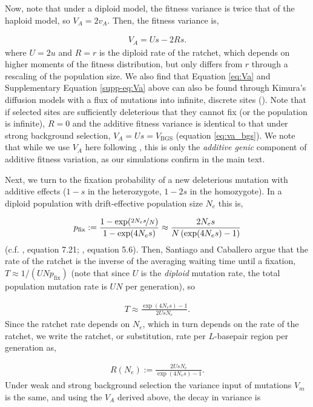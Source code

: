 \documentclass[11pt]{article}
\begin{document}
Now, note that under a diploid model, the fitness variance is twice that of the
haploid model, so $V_A = 2 v_A$. Then, the fitness variance is,

\begin{align}
  \label{supp-eq:Va}
  V_{A} = Us - 2Rs. 
\end{align}
%
where $U = 2u$ and $R=r$ is the diploid rate of the ratchet, which depends on
higher moments of the fitness distribution, but only differs from $r$ through a
rescaling of the population size. We also find that Equation \eqref{eq:Va} and
Supplementary Equation \ref{supp-eq:Va} above can also be found
through Kimura's diffusion models with a flux of mutations into infinite,
discrete sites (\citeyear{Kimura1969-jw}). Note that if selected sites are
sufficiently deleterious that they cannot fix (or the population is infinite),
$R=0$ and the additive fitness variance is identical to that under strong
background selection, $V_A = Us = V_\text{BGS}$ (equation \ref{eq:va_bgs}).
We note that while we use $V_A$ here following \textcite{Santiago2016-mu}, 
this is only the \emph{additive genic} component of additive fitness variation,
as our simulations confirm in the main text.

Next, we turn to the fixation probability of a new deleterious mutation with
additive effects ($1-s$ in the heterozygote, $1-2s$ in the homozygote). In a
diploid population with drift-effective population size $N_e$ this is,

\begin{align}
  p_\text{fix} := \frac{1-\exp(\nicefrac{2 N_e s}{N})}{1-\exp(4 N_e s)} \approx
  \frac{2 N_e s}{N \left(\exp(4 N_e s)-1\right)}
\end{align}
%
(c.f. \cite{Durrett2008-ql}, equation 7.21; \cite{Kimura1957-rk}, equation
5.6). Then, Santiago and Caballero argue that the rate of the ratchet is the
inverse of the averaging waiting time until a fixation, $T \approx 1/(UN
p_\text{fix})$ (note that since $U$ is the \emph{diploid} mutation rate, the
total population mutation rate is $UN$ per generation), so

\begin{align}
  T \approx \frac{\exp(4 N_e s)-1}{2 U s N_e}.
\end{align}
%
Since the ratchet rate depends on $N_e$, which in turn depends on the rate of
the ratchet, we write the ratchet, or substitution, rate per $L$-basepair
region per generation as,

\begin{align}
  R(N_e) := \frac{2 U s N_e}{\exp(4 N_e s)-1}.
\end{align}
%
Under weak and strong background selection the variance input of mutations
$V_m$ is the same, and using the $V_A$ derived above, the decay in variance is
\end{document}
